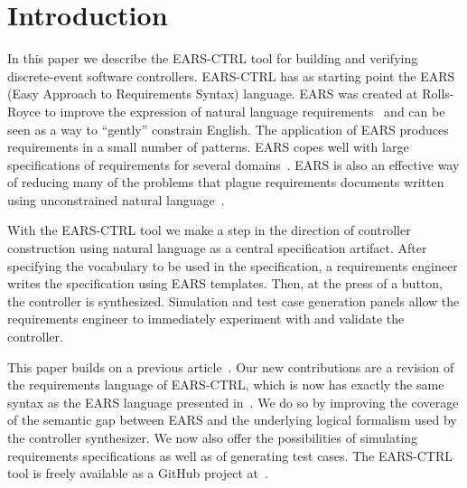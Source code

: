 \section{Introduction}
\vspace{-.3cm}In this paper we describe the \textsf{EARS-CTRL} tool for
building and verifying discrete-event software controllers. \textsf{EARS-CTRL} has as starting point
the EARS (Easy Approach to Requirements Syntax) language. EARS was created at Rolls-Royce to
improve the expression of natural language requirements~\cite{EARS09} and can be
seen as a way to ``gently'' constrain English. The application of EARS produces
requirements in a small number of patterns. EARS copes well with large
specifications of requirements for several domains~\cite{EARS10,EARS16}. EARS is
also an effective way of reducing many of the problems that plague requirements
documents written using unconstrained natural language~\cite{EARS09}.

With the \textsf{EARS-CTRL} tool we make a step in the direction of controller
construction using natural language as a central specification artifact.
After specifying the vocabulary to be used in the specification, a requirements
engineer writes the specification using EARS templates. Then, at the press of a
button, the controller is synthesized. Simulation and test case
generation panels allow the requirements engineer to immediately
experiment with and validate the controller.

This paper builds on a previous article~\cite{LucioRCM17}.
Our new contributions are a revision of the requirements language of
\textsf{EARS-CTRL}, which is now has exactly the same syntax as the EARS
language presented in~\cite{EARS09}. We do so by improving the coverage of the
semantic gap between EARS and the underlying logical formalism used by the controller synthesizer. We now also offer the
possibilities of simulating requirements specifications as well as of generating test cases.
The \textsf{EARS-CTRL} tool is freely available as a GitHub project 
at~\cite{EARSProject}. \vspace{-.4cm}

